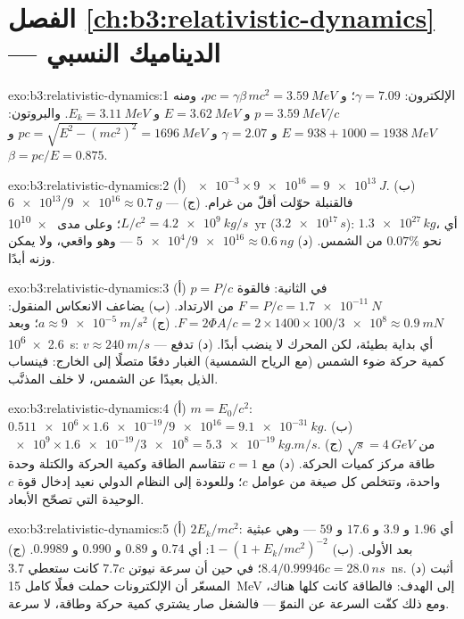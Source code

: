 \section*{الفصل \ref{ch:b3:relativistic-dynamics} --- الديناميك النسبي}

\begin{solution}{exo:b3:relativistic-dynamics:1}
الإلكترون: $\gamma = 7.09$؛ و $pc = \gamma\beta\,mc^2 = \qty{3.59}{MeV}$،
ومنه $p = \qty{3.59}{MeV}/c$ و $E = \qty{3.62}{MeV}$ و $E_k =
\qty{3.11}{MeV}$. والبروتون: $E = 938 + 1000 = \qty{1938}{MeV}$ و $\gamma
= 2.07$ و $pc = \sqrt{E^2 - (mc^2)^2} = \qty{1696}{MeV}$ و $\beta =
pc/E = 0.875$.
\end{solution}

\begin{solution}{exo:b3:relativistic-dynamics:2}
(أ) $\num{e-3} \times \num{9e16} = \qty{9e13}{J}$. (ب) $\num{6e13}/
\num{9e16} \approx \qty{0.7}{g}$ --- فالقنبلة حوّلت أقلّ من
غرام. (ج) $L/c^2 = \qty{4.2e9}{kg/s}$؛ وعلى مدى \qty{e10}{yr}
($\num{3.2e17}{}\,\unit{s}$): $\num{1.3e27}{}\,\unit{kg}$، أي نحو
$0.07\%$ من الشمس. (د) $\num{5e4}/\num{9e16} \approx
\qty{0.6}{ng}$ --- وهو واقعي، ولا يمكن وزنه أبدًا.
\end{solution}

\begin{solution}{exo:b3:relativistic-dynamics:3}
(أ) $p = P/c$ في الثانية: فالقوة $F = P/c = \qty{1.7e-11}{N}$ من
الارتداد. (ب) يضاعف الانعكاس المنقول: $F = 2\Phi A/c =
2 \times 1400 \times 100/\num{3e8} \approx \qty{0.9}{mN}$. (ج) $a
\approx \qty{9e-5}{m/s^2}$؛ وبعد \qty{2.6e6}{s}: $v \approx
\qty{240}{m/s}$ --- أي بداية بطيئة، لكن المحرك لا ينضب أبدًا. (د)
تدفع كمية حركة ضوء الشمس (مع الرياح الشمسية) الغبار
دفعًا متصلًا إلى الخارج: فينساب الذيل بعيدًا عن الشمس، لا خلف
المذنَّب.
\end{solution}

\begin{solution}{exo:b3:relativistic-dynamics:4}
(أ) $m = E_0/c^2$: $\num{0.511e6} \times \num{1.6e-19}/\num{9e16} =
\qty{9.1e-31}{kg}$. (ب) $\num{e9} \times \num{1.6e-19}/\num{3e8} =
\qty{5.3e-19}{kg.m/s}$. (ج) $\sqrt s = \qty{4}{GeV}$ من
طاقة مركز كميات الحركة. (د) مع $c = 1$ تتقاسم الطاقة وكمية الحركة
والكتلة وحدة واحدة، وتتخلص كل صيغة من عوامل $c$؛ وللعودة إلى
النظام الدولي نعيد إدخال قوة $c$ الوحيدة التي تصحّح الأبعاد.
\end{solution}

\begin{solution}{exo:b3:relativistic-dynamics:5}
(أ) $2E_k/mc^2$: أي $1.96$ و $3.9$ و $17.6$ و $59$ --- وهي عبثية بعد
الأولى. (ب) $1 - (1 + E_k/mc^2)^{-2}$: أي $0.74$ و $0.89$ و $0.990$
و $0.9989$. (ج) $8.4/0.99946c = \qty{28.0}{ns}$؛ في حين أن سرعة نيوتن $7.7c$ كانت
ستعطي \qty{3.7}{ns}. (د) أثبت المسعّر أن الإلكترونات
حملت فعلًا كامل \qty{15}{MeV} إلى الهدف: فالطاقة كانت
كلها هناك، ومع ذلك كفّت السرعة عن النموّ --- فالشغل صار يشتري
كمية حركة وطاقة، لا سرعة.
\end{solution}

